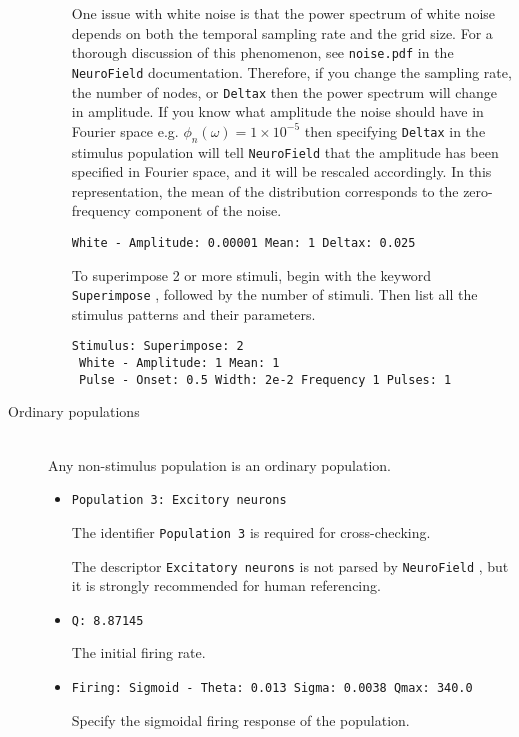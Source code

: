 \documentclass[12pt,a4paper]{article}
\newcommand{\type}[1]{ {\small\small\tt #1} }
\newcommand{\NF}[0]{ \type{NeuroField}}
\begin{document}
\begin{description}
\begin{itemize}
    One issue with white noise is that the power spectrum of white noise depends on both the temporal sampling rate and the grid size. For a thorough discussion of this phenomenon, see \type{noise.pdf} in the \NF documentation. Therefore, if you change the sampling rate, the number of nodes, or \type{Deltax} then the power spectrum will change in amplitude. If you know what amplitude the noise should have in Fourier space e.g. $\phi_n(\omega) = 1 \times 10^{-5}$ then specifying \type{Deltax} in the stimulus population will tell \NF that the amplitude has been specified in Fourier space, and it will be rescaled accordingly. In this representation, the mean of the distribution corresponds to the zero-frequency component of the noise. 
    
	\begin{lstlisting}
White - Amplitude: 0.00001 Mean: 1 Deltax: 0.025
	\end{lstlisting}
	
	To superimpose 2 or more stimuli, begin with the keyword \type{Superimpose}, followed by the number of stimuli. Then list all the stimulus patterns and their parameters.
	\begin{lstlisting}
Stimulus: Superimpose: 2
 White - Amplitude: 1 Mean: 1
 Pulse - Onset: 0.5 Width: 2e-2 Frequency 1 Pulses: 1
	\end{lstlisting}

	\end{itemize}
\item[Ordinary populations]\ \\
	Any non-stimulus population is an ordinary population.

	\begin{itemize}
	\item
	\begin{lstlisting}
Population 3: Excitory neurons
	\end{lstlisting}
	The identifier \type{Population 3} is required for cross-checking.
	
	The descriptor \type{Excitatory neurons} is not parsed by \NF, but it is strongly recommended for human referencing.
	\item
	\begin{lstlisting}
Q: 8.87145
	\end{lstlisting}
	The initial firing rate.
	\item
	\begin{lstlisting}
Firing: Sigmoid - Theta: 0.013 Sigma: 0.0038 Qmax: 340.0
	\end{lstlisting}
	Specify the sigmoidal firing response of the population.


\end{itemize}
\end{description}
\end{document}
